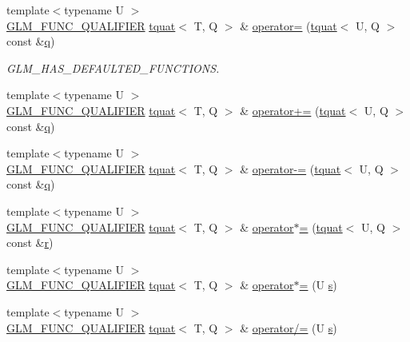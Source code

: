 \begin{DoxyCompactItemize}
\item 
{\footnotesize template$<$typename U $>$ }\\\hyperlink{setup_8hpp_a33fdea6f91c5f834105f7415e2a64407}{G\+L\+M\+\_\+\+F\+U\+N\+C\+\_\+\+Q\+U\+A\+L\+I\+F\+I\+ER} \hyperlink{structglm_1_1tquat}{tquat}$<$ T, Q $>$ \& \hyperlink{structglm_1_1tquat_abbfc6f4a48d94487207b0aef77a2809c}{operator=} (\hyperlink{structglm_1_1tquat}{tquat}$<$ U, Q $>$ const \&\hyperlink{_s_d_l__opengl_8h_a8fc1e7b9baaae687804c7eed46ca09c6}{q})
\begin{DoxyCompactList}\small\item\em G\+L\+M\+\_\+\+H\+A\+S\+\_\+\+D\+E\+F\+A\+U\+L\+T\+E\+D\+\_\+\+F\+U\+N\+C\+T\+I\+O\+NS. \end{DoxyCompactList}\item 
{\footnotesize template$<$typename U $>$ }\\\hyperlink{setup_8hpp_a33fdea6f91c5f834105f7415e2a64407}{G\+L\+M\+\_\+\+F\+U\+N\+C\+\_\+\+Q\+U\+A\+L\+I\+F\+I\+ER} \hyperlink{structglm_1_1tquat}{tquat}$<$ T, Q $>$ \& \hyperlink{structglm_1_1tquat_afe4fd15b1ec1080a813466f1ab3509c5}{operator+=} (\hyperlink{structglm_1_1tquat}{tquat}$<$ U, Q $>$ const \&\hyperlink{_s_d_l__opengl_8h_a8fc1e7b9baaae687804c7eed46ca09c6}{q})
\item 
{\footnotesize template$<$typename U $>$ }\\\hyperlink{setup_8hpp_a33fdea6f91c5f834105f7415e2a64407}{G\+L\+M\+\_\+\+F\+U\+N\+C\+\_\+\+Q\+U\+A\+L\+I\+F\+I\+ER} \hyperlink{structglm_1_1tquat}{tquat}$<$ T, Q $>$ \& \hyperlink{structglm_1_1tquat_a4b913cb3c700dfbe26207223690ac255}{operator-\/=} (\hyperlink{structglm_1_1tquat}{tquat}$<$ U, Q $>$ const \&\hyperlink{_s_d_l__opengl_8h_a8fc1e7b9baaae687804c7eed46ca09c6}{q})
\item 
{\footnotesize template$<$typename U $>$ }\\\hyperlink{setup_8hpp_a33fdea6f91c5f834105f7415e2a64407}{G\+L\+M\+\_\+\+F\+U\+N\+C\+\_\+\+Q\+U\+A\+L\+I\+F\+I\+ER} \hyperlink{structglm_1_1tquat}{tquat}$<$ T, Q $>$ \& \hyperlink{structglm_1_1tquat_a7cfc09d64f373aba2b65cb58691f1607}{operator$\ast$=} (\hyperlink{structglm_1_1tquat}{tquat}$<$ U, Q $>$ const \&\hyperlink{_s_d_l__opengl_8h_a42ce7cdc612e53abee15043f80220d97}{r})
\item 
{\footnotesize template$<$typename U $>$ }\\\hyperlink{setup_8hpp_a33fdea6f91c5f834105f7415e2a64407}{G\+L\+M\+\_\+\+F\+U\+N\+C\+\_\+\+Q\+U\+A\+L\+I\+F\+I\+ER} \hyperlink{structglm_1_1tquat}{tquat}$<$ T, Q $>$ \& \hyperlink{structglm_1_1tquat_a753a68a2bea0f6504d982404c6824e38}{operator$\ast$=} (U \hyperlink{_s_d_l__opengl_8h_a4af680a6c683f88ed67b76f207f2e6e4}{s})
\item 
{\footnotesize template$<$typename U $>$ }\\\hyperlink{setup_8hpp_a33fdea6f91c5f834105f7415e2a64407}{G\+L\+M\+\_\+\+F\+U\+N\+C\+\_\+\+Q\+U\+A\+L\+I\+F\+I\+ER} \hyperlink{structglm_1_1tquat}{tquat}$<$ T, Q $>$ \& \hyperlink{structglm_1_1tquat_a08d66426ba503daea896ae95eb666299}{operator/=} (U \hyperlink{_s_d_l__opengl_8h_a4af680a6c683f88ed67b76f207f2e6e4}{s})
\end{DoxyCompactItemize}
